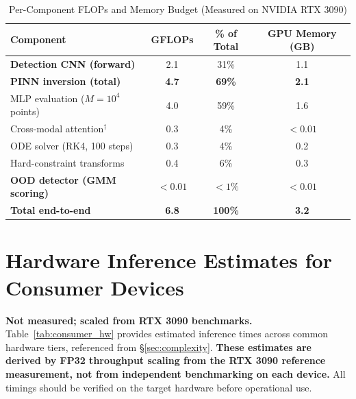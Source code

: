 \documentclass[usenatbib]{mnras}
\newcommand{\tablecomments}[1]{\vspace{4pt}{\footnotesize #1}\vspace{2pt}}
\begin{document}
\begin{table}[htbp]
\centering
\caption{Per-Component FLOPs and Memory Budget (Measured on NVIDIA RTX 3090)}\label{tab:flops_contribution}
\begin{tabular}{lccc}
\toprule
Component & GFLOPs & \% of Total & GPU Memory (GB) \\
\midrule
\textbf{Detection CNN (forward)} & 2.1 & 31\% & 1.1 \\
\midrule
\textbf{PINN inversion (total)} & \textbf{4.7} & \textbf{69\%} & \textbf{2.1} \\
\hspace{1em}MLP evaluation ($M=10^4$ points) & 4.0 & 59\% & 1.6 \\
\hspace{1em}Cross-modal attention$^\dagger$ & 0.3 & 4\% & $<0.01$ \\
\hspace{1em}ODE solver (RK4, 100 steps) & 0.3 & 4\% & 0.2 \\
\hspace{1em}Hard-constraint transforms & 0.4 & 6\% & 0.3 \\
\midrule
\textbf{OOD detector (GMM scoring)} & $<0.01$ & $<1\%$ & $<0.01$ \\
\midrule
\textbf{Total end-to-end} & \textbf{6.8} & \textbf{100\%} & \textbf{3.2} \\
\bottomrule
\end{tabular}
\tablecomments{All FLOPs measured on NVIDIA RTX 3090 (24~GB) with PyTorch~2.1.0, CUDA~12.1, batch size 1, input $256\times256\times1$ image + 1024-channel spectrum. Memory figures are inference-only. Cross-modal attention ($^\dagger$), ODE solver, and hard-constraint transforms are sub-components of the PINN inversion; their GFLOPs are included in the PINN total (4.7). Percentages may not sum exactly to 100\% due to rounding.}
\end{table}

\section{Hardware Inference Estimates for Consumer Devices}\label{app:consumer_hw}

\textbf{Not measured; scaled from RTX 3090 benchmarks.} Table~\ref{tab:consumer_hw} provides estimated inference times across common hardware tiers, referenced from \S\ref{sec:complexity}. \textbf{These estimates are derived by FP32 throughput scaling from the RTX 3090 reference measurement, not from independent benchmarking on each device.} All timings should be verified on the target hardware before operational use.
\end{document}

